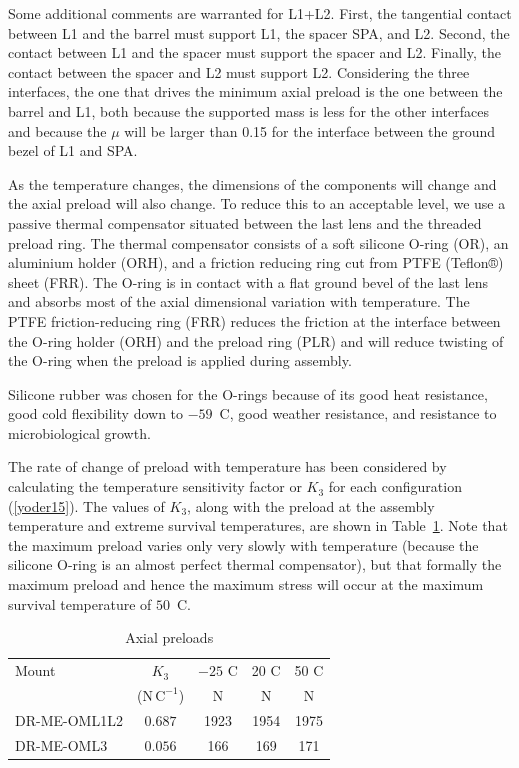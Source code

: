 \documentclass{article}
\newcommand{\unit}[1]{\ensuremath{\mathrm{#1}}}
\begin{document}
Some additional comments are warranted for L1+L2. First, the tangential contact between L1 and the barrel must support L1, the spacer SPA, and L2. Second, the contact between L1 and the spacer must support the spacer and L2. Finally, the contact between the spacer and L2 must support L2. Considering the three interfaces, the one that drives the minimum axial preload is the one between the barrel and L1, both because the supported mass is less for the other interfaces and because the $\mu$ will be larger than 0.15 for the interface between the ground bezel of L1 and SPA.

As the temperature changes, the dimensions of the components will change and  the axial preload will also change. To reduce this to an acceptable level, we use a passive thermal compensator situated between the last lens and the threaded preload ring. The thermal compensator consists of a soft silicone O-ring (OR), an aluminium holder (ORH), and a friction reducing ring cut from PTFE (Teflon®) sheet (FRR). The O-ring is in contact with a flat ground bevel of the last lens and absorbs most of the axial dimensional variation with temperature. The PTFE friction-reducing ring (FRR) reduces the friction at the interface between the O-ring holder (ORH) and the preload ring (PLR) and will reduce twisting of the O-ring when the preload is applied during assembly.

Silicone rubber was chosen for the O-rings because of its good heat resistance, good cold flexibility down to $-59$~C, good weather resistance, and resistance to microbiological growth.

The rate of change of preload with temperature has been considered by calculating the temperature sensitivity factor or $K_3$ for each configuration (\ref{yoder15}). The values of $K_3$, along with the preload at the assembly temperature and extreme survival temperatures, are shown in Table~\ref{table:preloads}. Note that the maximum preload varies only very slowly with temperature (because the silicone O-ring is an almost perfect thermal compensator), but that formally the maximum preload and hence the maximum stress will occur at the maximum survival temperature of $50$~C.


\begin{table}
\caption{Axial preloads}
\label{table:preloads}
\begin{center}
\small
\begin{tabular}{lcccc}
\hline
\hline
Mount&$K_3$&$-25$ C&20 C&50 C\\
&($\unit{N\,C^{-1}}$)&N&N&N\\
\hline
DR-ME-OML1L2   &$0.687$&\phantom{}1923&\phantom{}1954&\phantom{}1975\\
DR-ME-OML3     &$0.056$&\phantom{0}166&\phantom{0}169&\phantom{0}171\\
\hline
\end{tabular}
\end{center}
\end{table}
\end{document}
